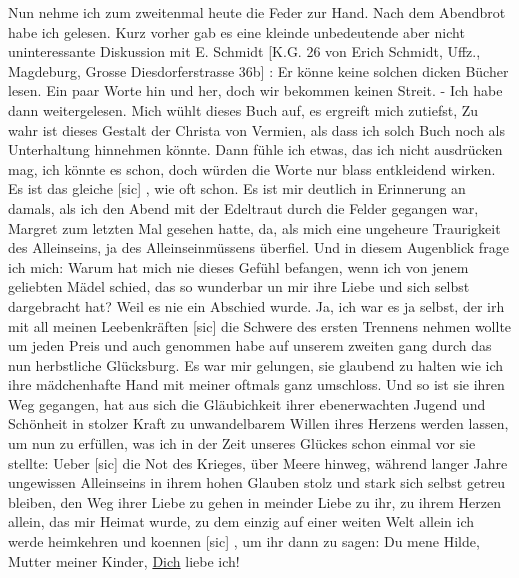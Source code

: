 \def\day{27. Oktober 42   abends.}
\mktitle

Nun nehme ich zum zweitenmal heute die Feder zur Hand.
Nach dem Abendbrot habe ich gelesen.
Kurz vorher gab es eine kleinde unbedeutende aber nicht uninteressante Diskussion mit E. Schmidt {\color{red} [K.G. 26 von Erich Schmidt, Uffz., Magdeburg, Grosse Diesdorferstrasse 36b] }: Er k\"{o}nne keine solchen dicken B\"{u}cher lesen.
Ein paar Worte hin und her, doch wir bekommen keinen Streit.
- Ich habe dann weitergelesen.
Mich w\"{u}hlt dieses Buch auf, es ergreift mich zutiefst,
Zu wahr ist dieses Gestalt der Christa von Vermien, als dass ich solch Buch noch als Unterhaltung hinnehmen k\"{o}nnte.
Dann f\"{u}hle ich etwas, das ich nicht ausdr\"{u}cken mag, ich k\"{o}nnte es schon, doch w\"{u}rden die Worte nur blass entkleidend wirken.
Es ist das gleiche{\color{red} [sic] }, wie oft schon.
Es ist mir deutlich in Erinnerung an damals, als ich den Abend mit der Edeltraut durch die Felder gegangen war, Margret zum letzten Mal gesehen hatte, da, als mich eine ungeheure Traurigkeit des Alleinseins, ja des Alleinseinm\"{u}ssens \"{u}berfiel.
Und in diesem Augenblick frage ich mich: Warum hat mich nie dieses Gef\"{u}hl befangen, wenn ich von jenem geliebten M\"{a}del schied, das so wunderbar un  mir ihre Liebe und sich selbst dargebracht hat?
Weil es nie ein Abschied wurde.
Ja, ich war es ja selbst, der irh mit all meinen Leebenkr\"{a}ften{\color{red} [sic] } die Schwere des ersten Trennens nehmen wollte um jeden Preis und auch genommen habe auf unserem zweiten gang durch das nun herbstliche Gl\"{u}cksburg.
Es war mir gelungen, sie glaubend zu halten wie ich ihre m\"{a}dchenhafte Hand mit meiner oftmals ganz umschloss.
Und so ist sie ihren Weg gegangen, hat aus sich die Gl\"{a}ubichkeit ihrer ebenerwachten Jugend und Sch\"{o}nheit in stolzer Kraft zu unwandelbarem Willen ihres Herzens werden lassen, um nun zu erf\"{u}llen, was ich in der Zeit unseres Gl\"{u}ckes schon einmal vor sie stellte: Ueber{\color{red} [sic] } die Not des Krieges, \"{u}ber Meere hinweg, w\"{a}hrend langer Jahre ungewissen Alleinseins in ihrem hohen Glauben stolz und stark sich selbst getreu bleiben, den Weg ihrer Liebe zu gehen in meinder Liebe zu ihr, zu ihrem Herzen allein, das mir Heimat wurde, zu dem einzig auf einer weiten Welt allein ich werde heimkehren und koennen{\color{red} [sic] }, um ihr dann zu sagen: Du mene Hilde, Mutter meiner Kinder, \ul{Dich} liebe ich!

\clearpage
